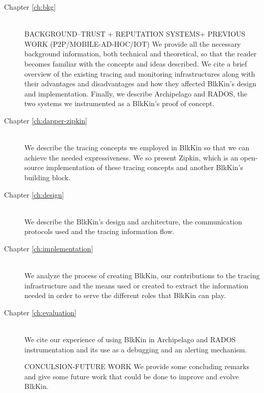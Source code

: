 \begin{description}
\item[Chapter \ref{ch:bkg}] \hfill \\

BACKGROUND--TRUST + REPUTATION SYSTEMS+
PREVIOUS WORK (P2P/MOBILE-AD-HOC/IOT)
We provide all the necessary background information, both technical and
theoretical, so that the reader becomes familiar with the concepts and ideas
described. We cite a brief overview of the existing tracing and monitoring
infrastructures along with their advantages and disadvantages and how they
affected BlkKin's design and implementation. Finally, we describe Archipelago
and RADOS, the two systems we instrumented as a BlkKin's proof of concept.


\item[Chapter \ref{ch:dapper-zipkin}] \hfill \\
We describe the tracing concepts we employed in BlkKin so that we can achieve
the needed expressiveness. We so present Zipkin, which is an open-source
implementation of these tracing concepts and another BlkKin's building block.

\item[Chapter \ref{ch:design}] \hfill \\
We describe the BlkKin's design and architecture, the communication protocols
used and the tracing information flow.

\item[Chapter \ref{ch:implementation}] \hfill \\
We analyze the process of creating BlkKin, our contributions to the tracing
infrastructure and the means used or created to extract the information needed
in order to serve the different roles that BlkKin can play.

\item[Chapter \ref{ch:evaluation}] \hfill \\
We cite our experience of using BlkKin in Archipelago and RADOS instrumentation
and its use as a debugging and an alerting mechanism.

CONCULSION-FUTURE WORK
We provide some concluding remarks and give some future work that could be done
to improve and evolve BlkKin.
\end{description}
